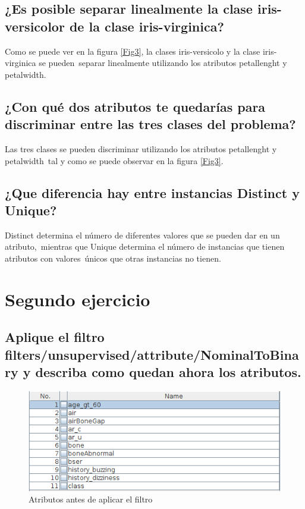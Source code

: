 \documentclass[11pt,twoside,a4paper]{book}
\begin{document}
\section{¿Es posible separar linealmente la clase iris-versicolor de la clase iris-virginica?}
Como se puede ver en la figura \ref{Fig3}, la clases iris-versicolo y la clase iris-virginica se pueden\
separar linealmente utilizando los atributos petallenght y petalwidth.

\section{¿Con qué dos atributos te quedarías para discriminar entre las tres clases del problema?}
Las tres clases se pueden discriminar utilizando los atributos petallenght y petalwidth\
tal y como se puede observar en la figura \ref{Fig3}.

\section{¿Que diferencia hay entre instancias Distinct y \break Unique?}
Distinct determina el número de diferentes valores que se pueden dar en un atributo,\
mientras que Unique determina el número de instancias que tienen atributos con valores\
únicos que otras instancias no tienen.


\chapter{Segundo ejercicio}

\section{Aplique el filtro filters/unsupervised/attribute/NominalToBinary y describa como quedan ahora los atributos.}
\begin{figure}[H]
	\includegraphics[width=\textwidth]{ejercicio2.png}
	\caption{Atributos antes de aplicar el filtro}
	\label{Fig4}
\end{figure}
\end{document}
